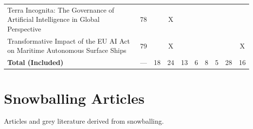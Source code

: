 \begin{landscape}
\begin{longtable}{|p{17cm}|c|c|c|c|c|c|c|c|c|}
		Terra Incognita: The Governance of Artificial Intelligence in Global Perspective                                                                        & 78          &                                    & X                                                         &                                                       &                                                            &                                           &                                              &                                                    &                                    \\
		Transformative Impact of the EU AI Act on Maritime Autonomous Surface Ships                                                                             & 79          &                                    & X                                                         &                                                       &                                                            &                                           &                                              &                                                    & X                                  \\
		\hline
		\textbf{Total (Included)}                                                                                                                               & ---         & 18                                 & 24                                                        & 13                                                    & 6                                                          & 8                                         & 5                                            & 28                                                 & 16                                 \\
		\hline
	\end{longtable}

	\section{Snowballing Articles}\label{sec:snowballing_articles_slr}

	Articles and grey literature derived from snowballing.


\end{landscape}
